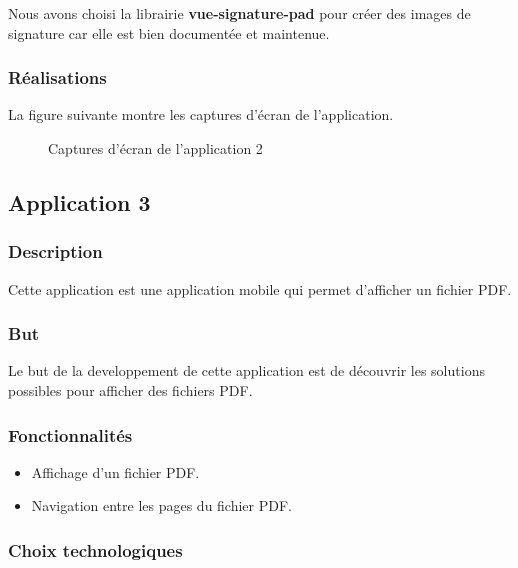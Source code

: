 Nous avons choisi la librairie \textbf{vue-signature-pad} pour créer des images de signature car elle est bien documentée et maintenue.


\subsubsection{Réalisations}
La figure suivante montre les captures d'écran de l'application.

\begin{figure}[H]
    \centering
    \caption{Captures d'écran de l'application 2}
    \label{appendix:capture_app2}
\end{figure}

\subsection{Application 3 }

\subsubsection{Description}
Cette application est une application mobile qui permet d'afficher un fichier PDF.

\subsubsection{But}
Le but de la developpement de cette application est de découvrir les solutions possibles pour afficher des fichiers PDF.

\subsubsection{Fonctionnalités}
\begin{itemize}
    \item Affichage d'un fichier PDF.
    \item Navigation entre les pages du fichier PDF.
\end{itemize}

\subsubsection{Choix technologiques}

